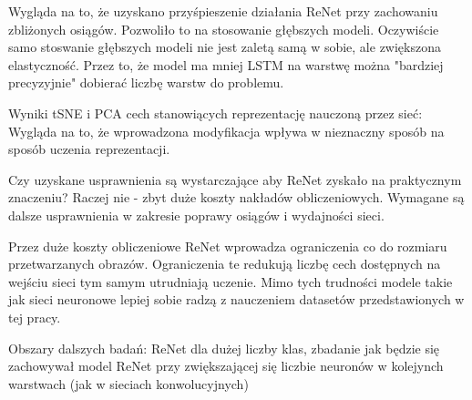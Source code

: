 \documentclass[oneside, mag]{mgr}
\begin{document}
Wygląda na to, że uzyskano przyśpieszenie działania ReNet przy zachowaniu zbliżonych osiągów. Pozwoliło to na stosowanie głębszych modeli. Oczywiście samo stoswanie głębszych modeli nie jest zaletą samą w sobie, ale zwiększona elastyczność. Przez to, że model ma mniej LSTM na warstwę można "bardziej precyzyjnie" dobierać liczbę warstw do problemu. 

Wyniki tSNE i PCA cech stanowiących reprezentację nauczoną przez sieć: Wygląda na to, że wprowadzona modyfikacja wpływa w nieznaczny sposób na sposób uczenia reprezentacji.

Czy uzyskane usprawnienia są wystarczające aby ReNet zyskało na praktycznym znaczeniu? Raczej nie - zbyt duże koszty nakładów obliczeniowych. Wymagane są dalsze usprawnienia w zakresie poprawy osiągów i wydajności sieci.

Przez duże koszty obliczeniowe ReNet wprowadza ograniczenia co do rozmiaru przetwarzanych obrazów. Ograniczenia te redukują liczbę cech dostępnych na wejściu sieci tym samym utrudniają uczenie. Mimo tych trudności modele takie jak sieci neuronowe lepiej sobie radzą z nauczeniem datasetów przedstawionych w tej pracy.

Obszary dalszych badań:
ReNet dla dużej liczby klas,
zbadanie jak będzie się zachowywał model ReNet przy zwiększającej się liczbie neuronów w kolejynch warstwach (jak w sieciach konwolucyjnych)



\listoffigures
\end{document}
